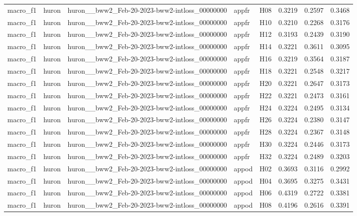 \begin{table}[tbp]
\begin{tabular}{lllllrrr}
macro\_f1 & huron & huron\_\_bww2\_Feb-20-2023-bww2-intloss\_00000000 & appfr & H08 & 0.3219 & 0.2597 & 0.3468 \\
macro\_f1 & huron & huron\_\_bww2\_Feb-20-2023-bww2-intloss\_00000000 & appfr & H10 & 0.3210 & 0.2268 & 0.3176 \\
macro\_f1 & huron & huron\_\_bww2\_Feb-20-2023-bww2-intloss\_00000000 & appfr & H12 & 0.3193 & 0.2439 & 0.3190 \\
macro\_f1 & huron & huron\_\_bww2\_Feb-20-2023-bww2-intloss\_00000000 & appfr & H14 & 0.3221 & 0.3611 & 0.3095 \\
macro\_f1 & huron & huron\_\_bww2\_Feb-20-2023-bww2-intloss\_00000000 & appfr & H16 & 0.3219 & 0.3564 & 0.3187 \\
macro\_f1 & huron & huron\_\_bww2\_Feb-20-2023-bww2-intloss\_00000000 & appfr & H18 & 0.3221 & 0.2548 & 0.3217 \\
macro\_f1 & huron & huron\_\_bww2\_Feb-20-2023-bww2-intloss\_00000000 & appfr & H20 & 0.3221 & 0.2647 & 0.3173 \\
macro\_f1 & huron & huron\_\_bww2\_Feb-20-2023-bww2-intloss\_00000000 & appfr & H22 & 0.3221 & 0.2473 & 0.3161 \\
macro\_f1 & huron & huron\_\_bww2\_Feb-20-2023-bww2-intloss\_00000000 & appfr & H24 & 0.3224 & 0.2495 & 0.3134 \\
macro\_f1 & huron & huron\_\_bww2\_Feb-20-2023-bww2-intloss\_00000000 & appfr & H26 & 0.3224 & 0.2380 & 0.3147 \\
macro\_f1 & huron & huron\_\_bww2\_Feb-20-2023-bww2-intloss\_00000000 & appfr & H28 & 0.3224 & 0.2367 & 0.3148 \\
macro\_f1 & huron & huron\_\_bww2\_Feb-20-2023-bww2-intloss\_00000000 & appfr & H30 & 0.3224 & 0.2446 & 0.3173 \\
macro\_f1 & huron & huron\_\_bww2\_Feb-20-2023-bww2-intloss\_00000000 & appfr & H32 & 0.3224 & 0.2489 & 0.3203 \\
macro\_f1 & huron & huron\_\_bww2\_Feb-20-2023-bww2-intloss\_00000000 & appod & H02 & 0.3693 & 0.3116 & 0.2992 \\
macro\_f1 & huron & huron\_\_bww2\_Feb-20-2023-bww2-intloss\_00000000 & appod & H04 & 0.3695 & 0.3275 & 0.3431 \\
macro\_f1 & huron & huron\_\_bww2\_Feb-20-2023-bww2-intloss\_00000000 & appod & H06 & 0.4319 & 0.2722 & 0.3381 \\
macro\_f1 & huron & huron\_\_bww2\_Feb-20-2023-bww2-intloss\_00000000 & appod & H08 & 0.4196 & 0.2616 & 0.3391 \\

\end{tabular}
\end{table}
